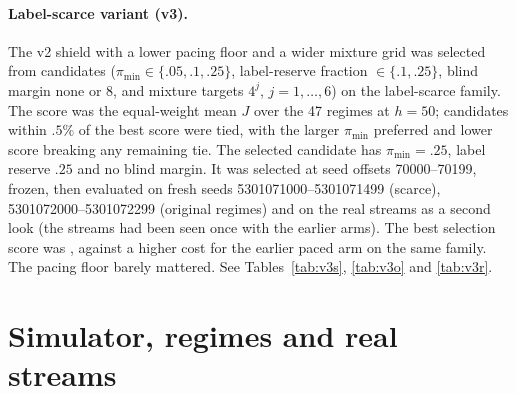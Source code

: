 \documentclass[10pt]{article}
\theoremstyle{plain}
\theoremstyle{definition}
\begin{document}
\paragraph{Label-scarce variant (v3).}\label{app:v3}
The v2 shield with a lower pacing floor and a wider mixture grid was selected from \VThreeNCand{} candidates ($\pi_{\min}\in\{.05,.1,.25\}$, label-reserve fraction $\in\{.1,.25\}$, blind margin none or 8, and mixture targets $4^j$, $j=1,\dots,6$) on the label-scarce family. The score was the equal-weight mean $J$ over the 47 regimes at $h=50$; candidates within $.5\%$ of the best score were tied, with the larger $\pi_{\min}$ preferred and lower score breaking any remaining tie. The selected candidate has $\pi_{\min}=.25$, label reserve $.25$ and no blind margin. It was selected at seed offsets 70000--70199, frozen, then evaluated on fresh seeds 5301071000--5301071499 (scarce), 5301072000--5301072299 (original regimes) and on the real streams as a second look (the streams had been seen once with the earlier arms). The best selection score was \VThreeBest, against a higher cost for the earlier paced arm on the same family. The pacing floor barely mattered. See Tables~\ref{tab:v3s}, \ref{tab:v3o} and \ref{tab:v3r}.
\begin{table}[!htbp]\caption{Label-scarce variant v3, registered \NRegimes{} regimes, fresh seeds.}\label{tab:v3o}\centering\scriptsize\resizebox{\linewidth}{!}{}\end{table}
\begin{table}[!htbp]\caption{Label-scarce variant v3 on the real streams (second look), clean feedback, pooled.}\label{tab:v3r}\centering\scriptsize\end{table}
\begin{table}[!htbp]\caption{Label-scarce variant v3, scarce family (47 regimes), fresh seeds.}\label{tab:v3s}\centering\scriptsize\resizebox{\linewidth}{!}{}\end{table}

\section{Simulator, regimes and real streams}\label{app:sim}
\end{document}
